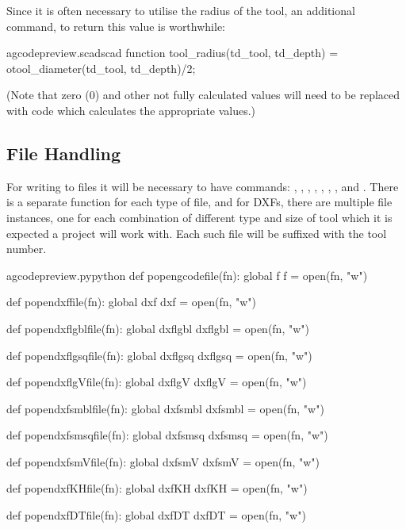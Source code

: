 \documentclass{ltxdoc}
\begin{document}
Since it is often necessary to utilise the radius of the tool, an additional command,
 to return this value is worthwhile:
 
\lstset{firstnumber=\thegcpscad}
\begin{writecode}{a}{gcodepreview.scad}{scad}
function tool_radius(td_tool, td_depth) = otool_diameter(td_tool, td_depth)/2;

\end{writecode}
\addtocounter{gcpscad}{2}
 
(Note that zero (0) and other not fully calculated values will need to be replaced 
with code which calculates the appropriate values.)
 
\subsection{File Handling}
 
For writing to files it will be necessary to have commands: 
, 
, 
, 
, 
, 
,  
, and 
.
There is a separate function for each type of file, and for DXFs, there are multiple file
instances, one for each combination of different type and size of tool which it is expected 
a project will work with. Each such file will be suffixed with the tool number.

\lstset{firstnumber=\thegcpy}
\begin{writecode}{a}{gcodepreview.py}{python}
def popengcodefile(fn):
    global f
    f = open(fn, "w")

def popendxffile(fn):
    global dxf
    dxf = open(fn, "w")

def popendxflgblfile(fn):
    global dxflgbl
    dxflgbl = open(fn, "w")

def popendxflgsqfile(fn):
    global dxflgsq
    dxflgsq = open(fn, "w")

def popendxflgVfile(fn):
    global dxflgV
    dxflgV = open(fn, "w")

def popendxfsmblfile(fn):
    global dxfsmbl
    dxfsmbl = open(fn, "w")

def popendxfsmsqfile(fn):
    global dxfsmsq
    dxfsmsq = open(fn, "w")

def popendxfsmVfile(fn):
    global dxfsmV
    dxfsmV = open(fn, "w")

def popendxfKHfile(fn):
    global dxfKH
    dxfKH = open(fn, "w")

def popendxfDTfile(fn):
    global dxfDT
    dxfDT = open(fn, "w")

\end{writecode}
\addtocounter{gcpy}{40}
\end{document}
